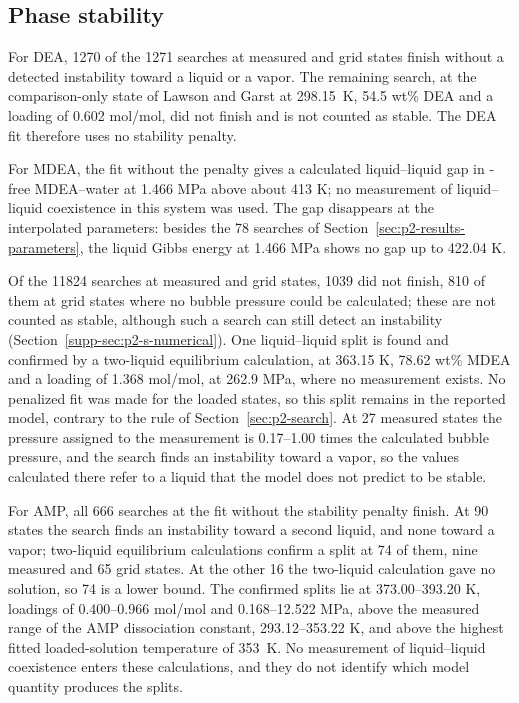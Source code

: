 

\subsection{Phase stability}\label{sec:p2-results-stability}
For DEA, 1270 of the 1271 searches at measured and grid states finish without a detected instability toward a liquid or a vapor.
The remaining search, at the comparison-only state of Lawson and Garst at 298.15~K, 54.5 wt\% DEA and a loading of 0.602 mol/mol, did not finish and is not counted as stable.
The DEA fit therefore uses no stability penalty.

For MDEA, the fit without the penalty gives a calculated liquid--liquid gap in \COtwo-free MDEA--water at 1.466 MPa above about 413 K; no measurement of liquid--liquid coexistence in this system was used.
The gap disappears at the interpolated parameters: besides the 78 searches of Section~\ref{sec:p2-results-parameters}, the liquid Gibbs energy at 1.466 MPa shows no gap up to 422.04 K.

Of the 11824 searches at measured and grid states, 1039 did not finish, 810 of them at grid states where no bubble pressure could be calculated; these are not counted as stable, although such a search can still detect an instability (Section~\ref{supp-sec:p2-s-numerical}).
One liquid--liquid split is found and confirmed by a two-liquid equilibrium calculation, at 363.15 K, 78.62 wt\% MDEA and a loading of 1.368 mol/mol, at 262.9 MPa, where no measurement exists.
No penalized fit was made for the loaded states, so this split remains in the reported model, contrary to the rule of Section~\ref{sec:p2-search}.
At 27 measured states the pressure assigned to the measurement is 0.17--1.00 times the calculated bubble pressure, and the search finds an instability toward a vapor, so the values calculated there refer to a liquid that the model does not predict to be stable.

For AMP, all 666 searches at the fit without the stability penalty finish.
At 90 states the search finds an instability toward a second liquid, and none toward a vapor; two-liquid equilibrium calculations confirm a split at 74 of them, nine measured and 65 grid states.
At the other 16 the two-liquid calculation gave no solution, so 74 is a lower bound.
The confirmed splits lie at 373.00--393.20 K, loadings of 0.400--0.966 mol/mol and 0.168--12.522 MPa, above the measured range of the AMP dissociation constant, 293.12--353.22 K, and above the highest fitted loaded-solution temperature of 353~K.
No measurement of liquid--liquid coexistence enters these calculations, and they do not identify which model quantity produces the splits.

